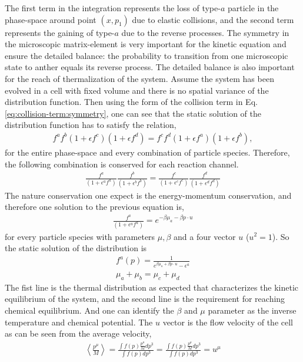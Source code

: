 The first term in the integration represents the loss of type-$a$ particle in the phase-space around point $(x, p_1)$ due to elastic collisions, and the second term represents the gaining of type-$a$ due to the reverse processes.
The symmetry in the microscopic matrix-element is very important for the kinetic equation and ensure the detailed balance: the probability to transition from one microscopic state to anther equals its reverse process.
The detailed balance is also important for the reach of thermalization of the system. 
Assume the system has been evolved in a cell with fixed volume and there is no spatial variance of the distribution function.
Then using the form of the collision term in Eq. \ref{eq:collision-term:symmetry}, one can see that the static solution of the distribution function has to satisfy the relation,
\begin{eqnarray}
f^a f^b (1+\epsilon f^c) (1+\epsilon f^d) = f^c f^d (1+\epsilon f^a) (1+\epsilon f^b),
\end{eqnarray}
for the entire phase-space and every combination of particle species.
Therefore, the following combination is conserved for each reaction channel.
 \begin{eqnarray}
\frac{f^a}{(1+\epsilon^a f^a)} \frac{f^b}{(1+\epsilon^b f^b)}
= \frac{f^c}{(1+\epsilon^c f^c)} \frac{f^d}{(1+\epsilon^d f^d)}
\end{eqnarray}
The nature conservation one expect is the energy-momentum conservation, and therefore one solution to the previous equation is,
\begin{eqnarray}
\frac{f^a}{(1+\epsilon^a f^a)} = e^{-\beta \mu_a-\beta p\cdot u}
\end{eqnarray}
for every particle species with parameters $\mu, \beta$ and a four vector $u$ ($u^2 = 1$). 
So the static solution of the distribution is 
\begin{eqnarray}
f^a(p) = \frac{1}{ e^{\beta \mu_a+\beta p\cdot u} - \epsilon^a} \label{eq:thermal}\\
\mu_a +\mu_b = \mu_c + \mu_d \label{eq:chem}
\end{eqnarray}
The fist line is the thermal distribution as expected that characterizes the kinetic equilibrium of the system, and the second line is the requirement for reaching chemical equilibrium. 
And one can identify the $\beta$ and $\mu$ parameter as the inverse temperature and chemical potential. The $u$ vector is the flow velocity of the cell as can be seen from the average velocity,
\begin{eqnarray}
\left\langle \frac{p^\mu}{M} \right\rangle = \frac{\int f(p) \frac{p^\mu}{M} dp^3}{\int f(p) dp^3} = \frac{\int f(p) \frac{p^\mu}{M} dp^3}{\int f(p) dp^3} = u^\mu
\end{eqnarray}


